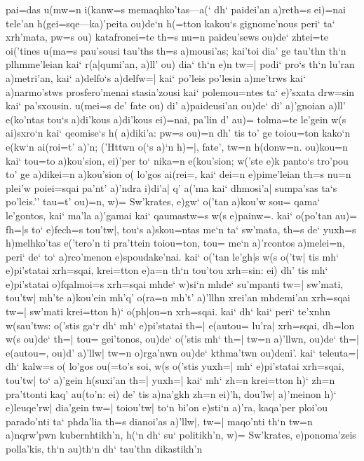 \documentclass[11pt]{book}
\newcommand {\Spag} {\Npag*{=+1}\Npar{1}\numerus{1}}
\newcommand {\Spar} {\Npar*{=+1}\numerus{1}}
\begin{document}
pai=das u(mw=n i(kanw=s memaqhko'tas---a(` dh` paidei'an a)reth=s ei)=nai
tele'an h(gei=sqe---ka)'peita ou)de`n h(=tton kakou`s gignome'nous peri`
ta` xrh'mata, pw=s ou) katafronei=te th=s nu=n paideu'sews ou)de` zhtei=te
oi('tines u(ma=s pau'sousi tau'ths th=s a)mousi'as; kai'toi dia' ge
tau'thn th`n plhmme'leian kai` r(a|qumi'an, a)ll' ou) dia` th`n e)n tw=|
podi` pro`s th`n lu'ran a)metri'an, kai` a)delfo`s a)delfw=| kai` po'leis
po'lesin a)me'trws kai` 
%
\Spar %
%
a)narmo'stws prosfero'menai stasia'zousi kai` polemou=ntes ta`
e)'sxata drw=sin kai` pa'sxousin. u(mei=s de' fate ou) di' a)paideusi'an
ou)de` di' a)'gnoian a)ll' e(ko'ntas tou`s a)di'kous a)di'kous ei)=nai,
pa'lin d' au)= tolma=te le'gein w(s ai)sxro`n kai` qeomise`s h( a)diki'a:
pw=s ou)=n dh' tis to' ge toiou=ton kako`n e(kw`n ai(roi=t' a)'n; ('Httwn
o(`s a)`n h)=|, fate', tw=n h(donw=n. ou)kou=n kai` tou=to a)kou'sion,
ei)'per to` nika=n e(kou'sion; w('ste e)k panto`s tro'pou to' ge a)dikei=n
a)kou'sion o( lo'gos ai(rei=, kai` dei=n e)pime'leian th=s
%
\Spar
%
nu=n plei'w poiei=sqai pa'nt' a)'ndra i)di'a| q' a('ma kai`
dhmosi'a| sumpa'sas ta`s po'leis.''
tau=t' ou)=n, w)= Sw'krates, e)gw` o('tan a)kou'w sou= qama` le'gontos,
kai` ma'la a)'gamai kai` qaumastw=s w(s e)painw=. kai` o(po'tan au)= fh=|s
to` e)fech=s tou'tw|, tou`s a)skou=ntas me`n ta` sw'mata, th=s de` yuxh=s
h)melhko'tas e('tero'n ti pra'ttein toiou=ton, tou= me`n a)'rcontos
a)melei=n, peri` de` to` a)rco'menon e)spoudake'nai. kai` o('tan le'gh|s
w(s o('tw| tis mh` e)pi'statai xrh=sqai, krei=tton e)a=n th`n tou'tou
xrh=sin: ei) dh' tis mh` e)pi'statai o)fqalmoi=s xrh=sqai mhde` w)si`n
mhde` su'mpanti tw=| sw'mati, tou'tw| mh'te a)kou'ein mh'q' o(ra=n mh't'
a)'llhn xrei'an mhdemi'an xrh=sqai tw=| sw'mati krei=tton h)` o(ph|ou=n
xrh=sqai.
%
\Spag
kai` dh` kai` peri` te'xnhn w(sau'tws: o('stis ga`r dh` mh`
e)pi'statai th=| e(autou= lu'ra| xrh=sqai, dh=lon w(s ou)de` th=| tou=
gei'tonos, ou)de` o('stis mh` th=| tw=n a)'llwn, ou)de` th=| e(autou=,
ou)d' a)'llw| tw=n o)rga'nwn ou)de` kthma'twn ou)deni'. kai` teleuta=| dh`
kalw=s o( lo'gos ou(=to's soi, w(s o('stis yuxh=| mh` e)pi'statai
xrh=sqai, tou'tw| to` a)'gein h(suxi'an th=| yuxh=| kai` mh` zh=n
krei=tton h)` zh=n pra'ttonti kaq' au(to'n: ei) de' tis a)na'gkh zh=n
ei)'h, dou'lw| a)'meinon
%
\Spar
%
h)` e)leuqe'rw| dia'gein tw=| toiou'tw| to`n bi'on e)sti`n a)'ra,
kaqa'per ploi'ou parado'nti ta` phda'lia th=s dianoi'as a)'llw|, tw=|
maqo'nti th`n tw=n a)nqrw'pwn kubernhtikh'n, h(`n dh` su` politikh'n, w)=
Sw'krates, e)ponoma'zeis polla'kis, th`n au)th`n dh` tau'thn dikastikh'n
\end{document}
